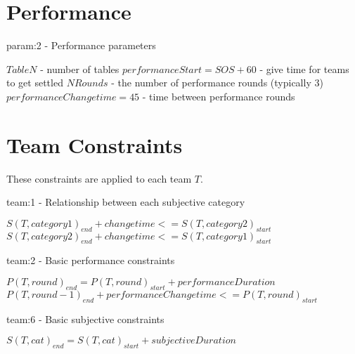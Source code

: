 \documentclass[letterpaper,11pt]{report}
\begin{document}
\FloatBarrier
\section{Performance}
\begin{algorithm}
\caption{param:2 - Performance parameters}
\begin{algorithmic}
\STATE $TableN$ - number of tables
\STATE $performanceStart = SOS + 60$ - give time for teams to get settled
\STATE $NRounds$ - the number of performance rounds (typically 3)
\STATE $performanceChangetime = 45$ - time between performance rounds
\end{algorithmic}
\end{algorithm}

\FloatBarrier
\section{Team Constraints}
These constraints are applied to each team $T$.

\begin{algorithm}
\caption{team:1 - Relationship between each subjective category}
\begin{algorithmic}
        \STATE $S(T, category1)_{end} + changetime <= S(T, category2)_{start}$
      \ELSE
        \STATE $S(T, category2)_{end} + changetime <= S(T, category1)_{start}$
      \ENDIF
    \ENDIF
  \ENDFOR
\ENDFOR
\end{algorithmic}
\end{algorithm}

\begin{algorithm}
\caption{team:2 - Basic performance constraints}
\begin{algorithmic}
  \STATE $P(T, round)_{end} = P(T, round)_{start} + performanceDuration$
\ENDFOR
{}
  \STATE $P(T, round-1)_{end} + performanceChangetime <= P(T, round)_{start}$
\ENDFOR
\end{algorithmic}
\end{algorithm}

\begin{algorithm}
\caption{team:6 - Basic subjective constraints}
\begin{algorithmic}
  \STATE $S(T, cat)_{end} = S(T, cat)_{start} + subjectiveDuration$
\ENDFOR
\end{algorithmic}
\end{algorithm}
\end{document}
